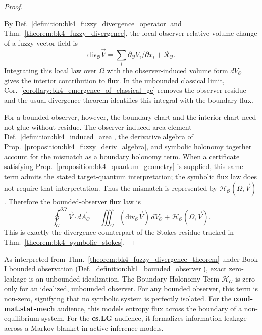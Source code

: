 \begin{proof}
\label{proof:bk4_fuzzy_divergence_theorem}
\leavevmode

By Def.~\ref{definition:bk4_fuzzy_divergence_operator} and
Thm.~\ref{theorem:bk4_fuzzy_divergence}, the local observer-relative volume
change of a fuzzy vector field is
\[
\mathrm{div}_{\mathcal O}\vec V
=
\sum_i\partial_{\mathcal O}V_i/\partial x_i+\mathcal R_{\mathcal O}.
\]
Integrating this local law over $\Omega$ with the observer-induced volume form
$dV_{\mathcal O}$ gives the interior contribution to flux. In the unbounded
classical limit, Cor.~\ref{corollary:bk4_emergence_of_classical_ge} removes the
observer residue and the usual divergence theorem identifies this integral with
the boundary flux.

For a bounded observer, however, the boundary chart and the interior chart need
not glue without residue. The observer-induced area element
Def.~\ref{definition:bk4_induced_area}, the derivative algebra of
Prop.~\ref{proposition:bk4_fuzzy_deriv_algebra}, and symbolic holonomy together account for the mismatch as a boundary holonomy term. When a certificate satisfying Prop.~\ref{proposition:bk4_quantum_geometry} is supplied, this same term admits the stated target-quantum interpretation; the symbolic flux law does not require that interpretation. Thus the mismatch is represented by
$\mathcal H_{\mathcal O}(\Omega,\vec V)$. Therefore the bounded-observer flux
law is
\[
\oint_{\mathcal{O}}^{\partial\Omega} \vec{V}\cdot d\vec A_{\mathcal O}
=
\iiint_{\Omega}(\mathrm{div}_{\mathcal O}\vec V)\,dV_{\mathcal O}
+\mathcal H_{\mathcal O}(\Omega,\vec V).
\]
This is exactly the divergence counterpart of the Stokes residue tracked in
Thm.~\ref{theorem:bk4_symbolic_stokes}.
\end{proof}

\begin{scholium}
\label{scholium:bk4_zero_is_idealized_in_boundedness}
As interpreted from Thm.~\ref{theorem:bk4_fuzzy_divergence_theorem} under Book I bounded observation (Def.~\ref{definition:bk1_bounded_observer}), exact zero-leakage is an unbounded idealization.
The Boundary Holonomy Term $\mathcal{H}_{\mathcal{O}}$ is zero only for an idealized, unbounded observer. For any bounded observer, this term is non-zero, signifying that no symbolic system is perfectly isolated. For the \textbf{cond-mat.stat-mech} audience, this models entropy flux across the boundary of a non-equilibrium system. For the \textbf{cs.LG} audience, it formalizes information leakage across a Markov blanket in active inference models.
\end{scholium}

